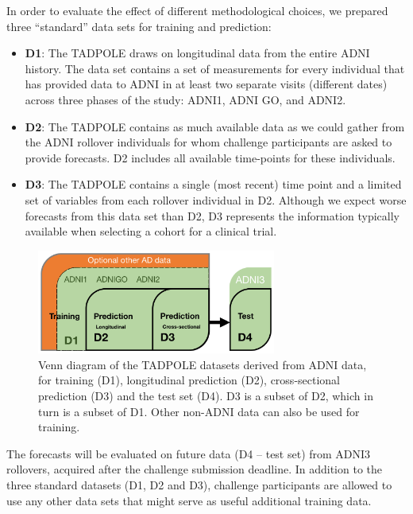In order to evaluate the effect of different methodological choices, we prepared three “standard” data sets for training and prediction: 
\begin{itemize}
 \item \textbf{D1}: The TADPOLE \underline{} draws on longitudinal data from the entire ADNI history. The data set contains a set of measurements for every individual that has provided data to ADNI in at least two separate visits (different dates) across three phases of the study: ADNI1, ADNI GO, and ADNI2. 
 \item \textbf{D2}: The TADPOLE \underline{} contains as much available data as we could gather from the ADNI rollover individuals for whom challenge participants are asked to provide forecasts. D2 includes all available time-points for these individuals. 
 \item \textbf{D3}: The TADPOLE \underline{} contains a single (most recent) time point and a limited set of variables from each rollover individual in D2. Although we expect worse forecasts from this data set than D2, D3 represents the information typically available when selecting a cohort for a clinical trial. 
\end{itemize}


\begin{figure}
 \centering
 \includegraphics[width=0.7\textwidth]{images/datasets_venn_diagram.png}
 \caption[Venn diagram of the TADPOLE datasets derived from ADNI data.]{Venn diagram of the TADPOLE datasets derived from ADNI data, for training (D1), longitudinal prediction (D2), cross-sectional prediction (D3) and the test set (D4). D3 is a subset of D2, which in turn is a subset of D1. Other non-ADNI data can also be used for training.}
 \label{fig:venn_diagram}
\end{figure}

The forecasts will be evaluated on future data (D4 -- test set) from ADNI3 rollovers, acquired after the challenge submission deadline. In addition to the three standard datasets (D1, D2 and D3), challenge participants are allowed to use any other data sets that might serve as useful additional training data.  

